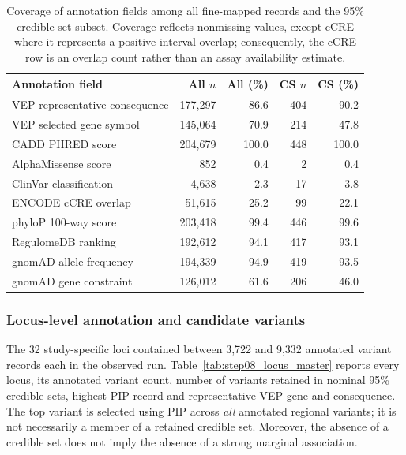 \documentclass[11pt,a4paper]{article}
\begin{document}
\begin{table}[htbp]
\centering
\small
\caption{Coverage of annotation fields among all
fine-mapped records and the 95\% credible-set subset.
Coverage reflects nonmissing values, except cCRE where
it represents a positive interval overlap; consequently,
the cCRE row is an overlap count rather than an assay
availability estimate.}
\label{tab:step08_coverage}
\begin{tabular}{@{}lrrrr@{}}
\toprule
Annotation field & All $n$ & All (\%) & CS $n$ & CS (\%) \\
\midrule
VEP representative consequence & 177,297 & 86.6 & 404 & 90.2 \\
VEP selected gene symbol & 145,064 & 70.9 & 214 & 47.8 \\
CADD PHRED score & 204,679 & 100.0 & 448 & 100.0 \\
AlphaMissense score & 852 & 0.4 & 2 & 0.4 \\
ClinVar classification & 4,638 & 2.3 & 17 & 3.8 \\
ENCODE cCRE overlap & 51,615 & 25.2 & 99 & 22.1 \\
phyloP 100-way score & 203,418 & 99.4 & 446 & 99.6 \\
RegulomeDB ranking & 192,612 & 94.1 & 417 & 93.1 \\
gnomAD allele frequency & 194,339 & 94.9 & 419 & 93.5 \\
gnomAD gene constraint & 126,012 & 61.6 & 206 & 46.0 \\
\bottomrule
\end{tabular}
\end{table}

\subsubsection{Locus-level annotation and candidate variants}

The 32 study-specific loci contained between 3,722
and 9,332 annotated variant records each in the
observed run. Table~\ref{tab:step08_locus_master}
reports every locus, its annotated variant count,
number of variants retained in nominal 95\% credible
sets, highest-PIP record and representative VEP gene
and consequence. The top variant is selected using
PIP across \emph{all} annotated regional variants;
it is not necessarily a member of a retained credible
set. Moreover, the absence of a credible set does not
imply the absence of a strong marginal association.
\end{document}
